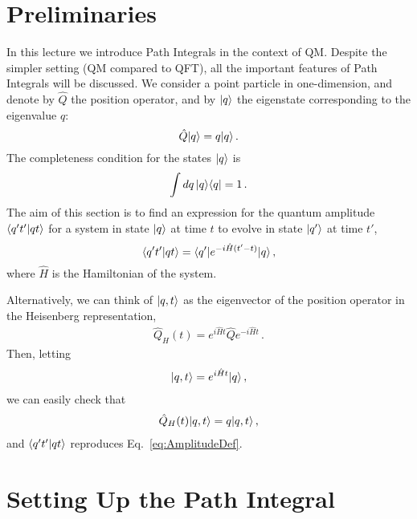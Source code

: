 \newcommand{\epsstep}{\left(e^{-i \hat{H} \epsilon}\right)}

\section{Preliminaries}
\label{sec:preliminaries-1}

In this lecture we introduce Path Integrals in the context of
QM. Despite the simpler setting (QM compared to QFT), all the
important features of Path Integrals will be discussed. We consider a
point particle in one-dimension, and denote by $\hat{Q}$ the position
operator, and by $| q \rangle$ the eigenstate corresponding to the eigenvalue
$q$:
\begin{equation}
  \label{eq:QEigen}
  \hat{Q} | q \rangle = q | q \rangle\, .
\end{equation}
The completeness condition for the states $| q \rangle$ is
\begin{equation}
  \label{eq:qComplete}
  \int dq\, | q \rangle\langle q | = 1\, .
\end{equation}
The aim of this section is to find an expression for the quantum
amplitude $\langle q't' | qt \rangle$ for a system in state $| q \rangle$ at time
$t$ to evolve in state $| q' \rangle$ at time $t'$,
\begin{equation}
  \label{eq:AmplitudeDef}
  \langle q't' | qt \rangle = \langle q' | e^{-i \hat{H} (t'-t)}|q\rangle\, ,
\end{equation}
where $\hat{H}$ is the Hamiltonian of the system. 

Alternatively, we can think of $| q,t \rangle$ as the eigenvector of the 
position operator in the Heisenberg representation, 
\begin{align}
  \label{eq:QHeisenberg}
  \hat{Q}_H(t) = e^{i \hat{H} t} \hat{Q} e^{-i \hat{H}t}\, .
\end{align}
Then, letting 
\begin{align}
  \label{eq:HeisenbergEigenvect}
  | q,t \rangle = e^{i \hat{H}t} | q \rangle\, ,
\end{align}
we can easily check that
\begin{align}
  \label{eq:HeisenbergCheck}
  \hat{Q}_H(t) | q,t \rangle = q | q,t \rangle\, ,
\end{align}
and $\langle q't' | qt \rangle$ reproduces Eq.~\eqref{eq:AmplitudeDef}.

\section{Setting Up the Path Integral}
\label{sec:setting-up-path}

